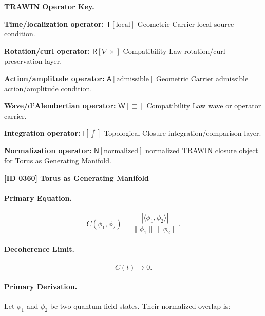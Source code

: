 \par\vspace{0.45\baselineskip}
\noindent\begin{minipage}[t]{\linewidth}
\begingroup
\small
\raggedright
\textbf{TRAWIN Operator Key.}\par
\noindent\textbf{Time/localization operator:} $\mathsf{T}\!\left[\mathrm{local}\right]$ Geometric Carrier local source condition.\par
\noindent\textbf{Rotation/curl operator:} $\mathsf{R}\!\left[\nabla\times\right]$ Compatibility Law rotation/curl preservation layer.\par
\noindent\textbf{Action/amplitude operator:} $\mathsf{A}\!\left[\mathrm{admissible}\right]$ Geometric Carrier admissible action/amplitude condition.\par
\noindent\textbf{Wave/d'Alembertian operator:} $\mathsf{W}\!\left[\Box\right]$ Compatibility Law wave or operator carrier.\par
\noindent\textbf{Integration operator:} $\mathsf{I}\!\left[\int\right]$ Topological Closure integration/comparison layer.\par
\noindent\textbf{Normalization operator:} $\mathsf{N}\!\left[\mathrm{normalized}\right]$ normalized TRAWIN closure object for Torus as Generating Manifold.\par
\endgroup
\end{minipage}

\clearpage
\noindent\textbf{[ID 0360] Torus as Generating Manifold}\par
\vspace{0.35em}
\paragraph{Primary Equation.}
\begin{equation}
C(\phi_1,\phi_2)
=
\frac{
|\langle \phi_1,\phi_2\rangle|
}{
\|\phi_1\|\,\|\phi_2\|
}.
\end{equation}

\paragraph{Decoherence Limit.}
\begin{equation}
C(t)\rightarrow 0 .
\end{equation}

\paragraph{Primary Derivation.}
Let $\phi_1$ and $\phi_2$ be two quantum field states.  
Their normalized overlap is:

